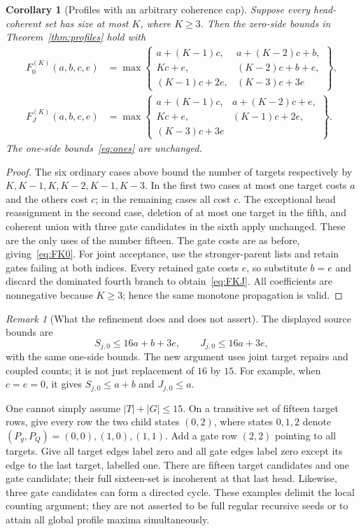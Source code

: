 \documentclass[11pt]{amsart}
\newtheorem{corollary}[theorem]{Corollary}
\theoremstyle{definition}
\theoremstyle{remark}
\newtheorem{remark}[theorem]{Remark}
\begin{document}
\begin{corollary}[Profiles with an arbitrary coherence cap]
\label{cor:cap-profiles}
Suppose every head-coherent set has size at most $K$, where $K\ge3$.
Then the zero-side bounds in Theorem~\ref{thm:profiles} hold with
\begin{align}
 F_0^{(K)}(a,b,c,e)&=\max\left\{
 \begin{array}{ll}
 a+(K-1)c,&a+(K-2)c+b,\\
 Kc+e,&(K-2)c+b+e,\\
 (K-1)c+2e,&(K-3)c+3e
 \end{array}\right\},\label{eq:FK0}\\
 F_J^{(K)}(a,b,c,e)&=\max\left\{
 \begin{array}{ll}
 a+(K-1)c,&a+(K-2)c+e,\\
 Kc+e,&(K-1)c+2e,\\
 (K-3)c+3e&
 \end{array}\right\}.\label{eq:FKJ}
\end{align}
The one-side bounds~\eqref{eq:ones} are unchanged.
\end{corollary}
\begin{proof}
The six ordinary cases above bound the number of targets respectively by
$K,K-1,K,K-2,K-1,K-3$. In the first two cases at most one target costs
$a$ and the others cost $c$; in the remaining cases all cost $c$.
The exceptional head reassignment in the second case, deletion of at most
one target in the fifth, and coherent union with three gate candidates in
the sixth apply unchanged. These are the only uses of the number fifteen.
The gate costs are as before, giving~\eqref{eq:FK0}. For joint acceptance,
use the stronger-parent lists and retain gates failing at both indices.
Every retained gate costs $e$, so substitute $b=e$ and discard the dominated
fourth branch to obtain~\eqref{eq:FKJ}. All coefficients are nonnegative
because $K\ge3$; hence the same monotone propagation is valid.
\end{proof}

\begin{remark}[What the refinement does and does not assert]
The displayed source bounds are
\begin{equation}\label{eq:published}
 S_{j,0}\le16a+b+3e,\qquad J_{j,0}\le16a+3e,
\end{equation}
with the same one-side bounds. The new argument uses joint target
repairs and coupled counts; it is not just replacement of $16$ by $15$.
For example, when $c=e=0$, it gives $S_{j,0}\le a+b$ and
$J_{j,0}\le a$.

One cannot simply assume $|T|+|G|\le15$. On a transitive set of fifteen
target rows, give every row the two child states $(0,2)$, where states
$0,1,2$ denote $(P_g,P_Q)=(0,0),(1,0),(1,1)$. Add a gate row $(2,2)$
pointing to all targets. Give all target edges label zero and all gate
edges label zero except its edge to the last target, labelled one.
There are fifteen target candidates and one gate candidate; their full
sixteen-set is incoherent at that last head. Likewise, three gate
candidates can form a directed cycle. These examples delimit the local
counting argument; they are not asserted to be full regular recursive
seeds or to attain all global profile maxima simultaneously.
\end{remark}
\end{document}
